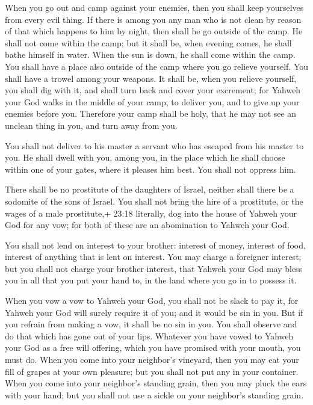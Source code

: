  When you go out and camp against your enemies, then you
shall keep yourselves from every evil thing.  If there is
among you any man who is not clean by reason of that which happens to
him by night, then shall he go outside of the camp. He shall not come
within the camp;  but it shall be, when evening comes, he
shall bathe himself in water. When the sun is down, he shall come within
the camp.  You shall have a place also outside of the camp
where you go relieve yourself.  You shall have a trowel
among your weapons. It shall be, when you relieve yourself, you shall
dig with it, and shall turn back and cover your excrement; 
for Yahweh your God walks in the middle of your camp, to deliver you,
and to give up your enemies before you. Therefore your camp shall be
holy, that he may not see an unclean thing in you, and turn away from
you.

 You shall not deliver to his master a servant who has
escaped from his master to you.  He shall dwell with you,
among you, in the place which he shall choose within one of your gates,
where it pleases him best. You shall not oppress him.

 There shall be no prostitute of the daughters of Israel,
neither shall there be a sodomite of the sons of Israel. 
You shall not bring the hire of a prostitute, or the wages of a male
prostitute,+ 23:18 literally, dog into the house of Yahweh your God for
any vow; for both of these are an abomination to Yahweh your God.

 You shall not lend on interest to your brother: interest
of money, interest of food, interest of anything that is lent on
interest.  You may charge a foreigner interest; but you
shall not charge your brother interest, that Yahweh your God may bless
you in all that you put your hand to, in the land where you go in to
possess it.

 When you vow a vow to Yahweh your God, you shall not be
slack to pay it, for Yahweh your God will surely require it of you; and
it would be sin in you.  But if you refrain from making a
vow, it shall be no sin in you.  You shall observe and do
that which has gone out of your lips. Whatever you have vowed to Yahweh
your God as a free will offering, which you have promised with your
mouth, you must do.  When you come into your neighbor's
vineyard, then you may eat your fill of grapes at your own pleasure; but
you shall not put any in your container.  When you come
into your neighbor's standing grain, then you may pluck the ears with
your hand; but you shall not use a sickle on your neighbor's standing
grain.

